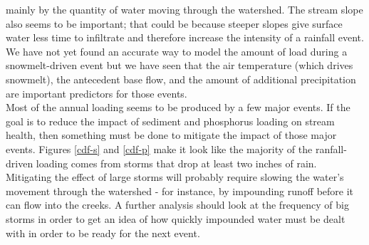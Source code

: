 \documentclass[10pt]{article}
\begin{document}
mainly by the quantity of water moving through the watershed. The stream slope also seems to be important; that could be because steeper slopes give surface water less time to infiltrate and therefore increase the intensity of a rainfall event.\\

We have not yet found an accurate way to model the amount of load during a snowmelt-driven event but we have seen that the air temperature (which drives snowmelt), the antecedent base flow, and the amount of additional precipitation are important predictors for those events.\\

Most of the annual loading seems to be produced by a few major events. If the goal is to reduce the impact of sediment and phosphorus loading on stream health, then something must be done to mitigate the impact of those major events. Figures \ref{cdf-s} and \ref{cdf-p} make it look like the majority of the ranfall-driven loading comes from storms that drop at least two inches of rain. Mitigating the effect of large storms will probably require slowing the water's movement through the watershed - for instance, by impounding runoff before it can flow into the creeks. A further analysis should look at the frequency of big storms in order to get an idea of how quickly impounded water must be dealt with in order to be ready for the next event.\\
\end{document}
